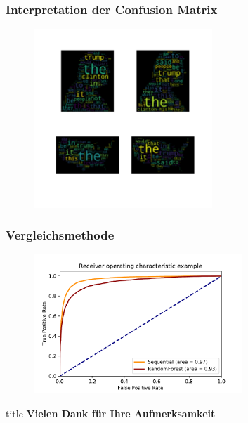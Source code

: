 \documentclass[aspectratio=1610, professionalfonts, 9pt]{beamer}
\begin{document}
  \begin{frame}
    \frametitle{Interpretation der Confusion Matrix}
    \begin{figure}
      \includegraphics[width=0.6\textwidth]{pictures/bow/cnfn_wordcloud.pdf}
      \caption{}
      \label{}
    \end{figure}
  \end{frame}

  \begin{frame}
    \frametitle{Vergleichsmethode}
    \begin{figure}
      \includegraphics[width=0.7\textwidth]{pictures/bow/roc_comparison.pdf}
      \caption{}
      \label{}
    \end{figure}
  \end{frame}

  \begin{frame}
    \vfill
    \centering
    \begin{beamercolorbox}[sep=8pt,center,shadow=false,rounded=true]{title}
      \huge{\textbf{Vielen Dank für Ihre Aufmerksamkeit}}
    \end{beamercolorbox}
  \end{frame}
\end{document}
